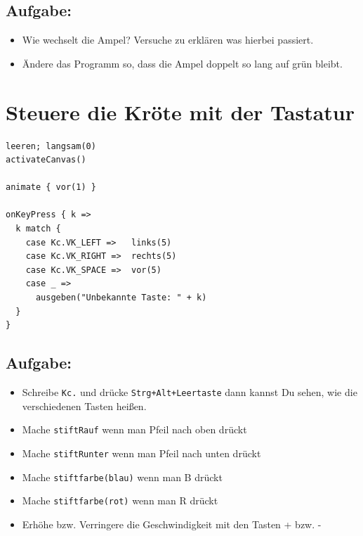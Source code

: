 \section*{\color{BrickRed}Aufgabe:}


\begin{itemize}

\item {Wie wechselt die Ampel? Versuche zu erklären was hierbei passiert.}
\item {Ändere das Programm so, dass die Ampel doppelt so lang auf grün bleibt.}

\end{itemize}


\chapter{Steuere die Kröte mit der Tastatur}
\begin{multicols}{2}

\begin{lstlisting}[basicstyle={\ttfamily\fontsize{18}{22}\selectfont},numbers=none]
leeren; langsam(0)
activateCanvas()

animate { vor(1) }

onKeyPress { k =>
  k match {
    case Kc.VK_LEFT =>   links(5)
    case Kc.VK_RIGHT =>  rechts(5)
    case Kc.VK_SPACE =>  vor(5)
    case _ => 
      ausgeben("Unbekannte Taste: " + k)
  }
}
\end{lstlisting}
        


\columnbreak


\section*{\color{BrickRed}Aufgabe:}


\begin{itemize}

\item {Schreibe \lstinline{Kc.} und drücke \lstinline{Strg+Alt+Leertaste} dann kannst Du sehen, wie die verschiedenen Tasten heißen.}
\item {Mache \lstinline{stiftRauf} wenn man Pfeil nach oben drückt}
\item {Mache \lstinline{stiftRunter} wenn man Pfeil nach unten drückt}
\item {Mache \lstinline{stiftfarbe(blau)} wenn man B drückt}
\item {Mache \lstinline{stiftfarbe(rot)} wenn man R drückt}
\item {Erhöhe bzw. Verringere die Geschwindigkeit mit den Tasten + bzw. -}

\end{itemize}


\end{multicols}

